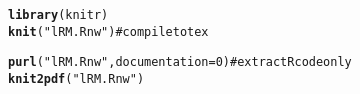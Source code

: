 \documentclass{article}\usepackage{graphicx, color}
\makeatletter
\newcommand{\hlfunctioncall}[1]{\textcolor[rgb]{0.501960784313725,0,0.329411764705882}{\textbf{#1}}}%
\newcommand{\hlstring}[1]{\textcolor[rgb]{0.6,0.6,1}{#1}}%
\newenvironment{kframe}{%
 \def\at@end@of@kframe{}%
 \ifinner\ifhmode%
  \def\at@end@of@kframe{\end{minipage}}%
  \begin{minipage}{\columnwidth}%
 \fi\fi%
 \def\FrameCommand##1{\hskip\@totalleftmargin \hskip-\fboxsep
 \colorbox{shadecolor}{##1}\hskip-\fboxsep
     \hskip-\linewidth \hskip-\@totalleftmargin \hskip\columnwidth}%
 \MakeFramed {\advance\hsize-\width
   \@totalleftmargin\z@ \linewidth\hsize
   \@setminipage}}%
 {\par\unskip\endMakeFramed%
 \at@end@of@kframe}
\newenvironment{knitrout}{}{} %
\makeatother
\begin{document}
\begin{knitrout}
\color{fgcolor}\begin{kframe}
\begin{alltt}
\hlfunctioncall{library}(knitr)
\hlfunctioncall{knit}(\hlstring{"lRM.Rnw"})  # compile to tex
\end{alltt}


{\ttfamily\noindent\bfseries\color{errorcolor}{\#\# Error: duplicated label 'setup'}}\begin{alltt}
\hlfunctioncall{purl}(\hlstring{"lRM.Rnw"}, documentation = 0)  # extract R code only
\hlfunctioncall{knit2pdf}(\hlstring{"lRM.Rnw"})
\end{alltt}


{\ttfamily\noindent\bfseries\color{errorcolor}{\#\# Error: duplicated label 'setup'}}\end{kframe}
\end{knitrout}
\end{document}
